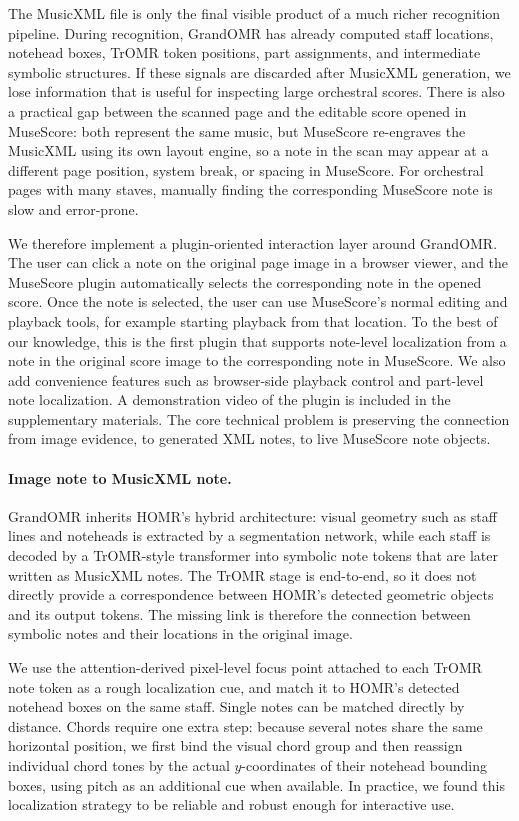 \documentclass[11pt,a4paper]{article}
\begin{document}
The MusicXML file is only the final visible product of a much richer recognition pipeline.
During recognition, GrandOMR has already computed staff locations, notehead boxes, TrOMR token positions, part assignments, and intermediate symbolic structures.
If these signals are discarded after MusicXML generation, we lose information that is useful for inspecting large orchestral scores.
There is also a practical gap between the scanned page and the editable score opened in MuseScore: both represent the same music, but MuseScore re-engraves the MusicXML using its own layout engine, so a note in the scan may appear at a different page position, system break, or spacing in MuseScore.
For orchestral pages with many staves, manually finding the corresponding MuseScore note is slow and error-prone.

We therefore implement a plugin-oriented interaction layer around GrandOMR.
The user can click a note on the original page image in a browser viewer, and the MuseScore plugin automatically selects the corresponding note in the opened score.
Once the note is selected, the user can use MuseScore's normal editing and playback tools, for example starting playback from that location.
To the best of our knowledge, this is the first plugin that supports note-level localization from a note in the original score image to the corresponding note in MuseScore.
We also add convenience features such as browser-side playback control and part-level note localization.
A demonstration video of the plugin is included in the supplementary materials.
The core technical problem is preserving the connection from image evidence, to generated XML notes, to live MuseScore note objects.

\paragraph{Image note to MusicXML note.}
GrandOMR inherits HOMR's hybrid architecture: visual geometry such as staff lines and noteheads is extracted by a segmentation network, while each staff is decoded by a TrOMR-style transformer into symbolic note tokens that are later written as MusicXML notes.
The TrOMR stage is end-to-end, so it does not directly provide a correspondence between HOMR's detected geometric objects and its output tokens.
The missing link is therefore the connection between symbolic notes and their locations in the original image.

We use the attention-derived pixel-level focus point attached to each TrOMR note token as a rough localization cue, and match it to HOMR's detected notehead boxes on the same staff.
Single notes can be matched directly by distance.
Chords require one extra step: because several notes share the same horizontal position, we first bind the visual chord group and then reassign individual chord tones by the actual $y$-coordinates of their notehead bounding boxes, using pitch as an additional cue when available.
In practice, we found this localization strategy to be reliable and robust enough for interactive use.
\end{document}
